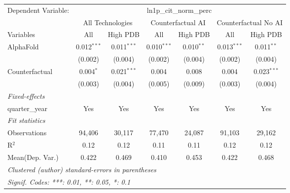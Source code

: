 \begingroup
\centering
\begin{tabular}{lcccccc}
   \tabularnewline \midrule \midrule
   Dependent Variable: & \multicolumn{6}{c}{ln1p\_cit\_norm\_perc}\\
 & \multicolumn{2}{c}{All Technologies} & \multicolumn{2}{c}{Counterfactual AI} & \multicolumn{2}{c}{Counterfactual No AI} \\
\cmidrule(lr){1-1}\cmidrule(lr){2-3} \cmidrule(lr){4-5} \cmidrule(lr){6-7}
Variables & \multicolumn{1}{c}{All} & \multicolumn{1}{c}{High PDB} & \multicolumn{1}{c}{All} & \multicolumn{1}{c}{High PDB} & \multicolumn{1}{c}{All} & \multicolumn{1}{c}{High PDB} \\
\cmidrule(lr){1-1}\cmidrule(lr){2-2} \cmidrule(lr){3-3} \cmidrule(lr){4-4} \cmidrule(lr){5-5} \cmidrule(lr){6-6} \cmidrule(lr){7-7}
   AlphaFold      & 0.012$^{***}$ & 0.011$^{***}$ & 0.010$^{***}$ & 0.010$^{**}$ & 0.013$^{***}$ & 0.011$^{**}$\\   
                  & (0.002)       & (0.004)       & (0.002)       & (0.004)      & (0.002)       & (0.004)\\   
   Counterfactual & 0.004$^{*}$   & 0.021$^{***}$ & 0.004         & 0.008        & 0.004         & 0.023$^{***}$\\   
                  & (0.003)       & (0.004)       & (0.005)       & (0.009)      & (0.003)       & (0.004)\\   
   \midrule
   \emph{Fixed-effects}\\
   quarter\_year  & Yes           & Yes           & Yes           & Yes          & Yes           & Yes\\  
   \midrule
   \emph{Fit statistics}\\
   Observations   & 94,406        & 30,117        & 77,470        & 24,087       & 91,103        & 29,162\\  
   R$^2$          & 0.12          & 0.12          & 0.11          & 0.11         & 0.12          & 0.12\\  
Mean(Dep. Var.) & 0.422 & 0.469 & 0.410 & 0.453 & 0.422 & 0.468 \\
   \midrule \midrule
   \multicolumn{7}{l}{\emph{Clustered (author) standard-errors in parentheses}}\\
   \multicolumn{7}{l}{\emph{Signif. Codes: ***: 0.01, **: 0.05, *: 0.1}}\\
\end{tabular}
\par\endgroup
